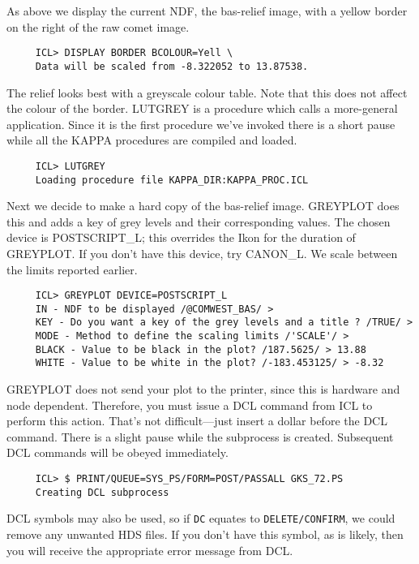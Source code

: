 As above we display the current NDF, the bas-relief image, with a yellow
border on the right of the raw comet image.

\small
\begin{verbatim}
     ICL> DISPLAY BORDER BCOLOUR=Yell \
     Data will be scaled from -8.322052 to 13.87538.
\end{verbatim}
\normalsize

The relief looks best with a greyscale colour table.  Note that this
does not affect the colour of the border.  LUTGREY is a procedure
which calls a more-general application.  Since it is the first
procedure we've invoked there is a short pause while all the {\small
KAPPA} procedures are compiled and loaded.

\small
\begin{verbatim}
     ICL> LUTGREY
     Loading procedure file KAPPA_DIR:KAPPA_PROC.ICL
\end{verbatim}
\normalsize

Next we decide to make a hard copy of the bas-relief image.  GREYPLOT
does this and adds a key of grey levels and their corresponding values.
The chosen device is POSTSCRIPT\_L; this overrides the Ikon for the
duration of GREYPLOT.  If you don't have this device, try CANON\_L.
We scale between the limits reported earlier.

\small
\begin{verbatim}
     ICL> GREYPLOT DEVICE=POSTSCRIPT_L
     IN - NDF to be displayed /@COMWEST_BAS/ >
     KEY - Do you want a key of the grey levels and a title ? /TRUE/ >
     MODE - Method to define the scaling limits /'SCALE'/ >
     BLACK - Value to be black in the plot? /187.5625/ > 13.88
     WHITE - Value to be white in the plot? /-183.453125/ > -8.32
\end{verbatim}
\normalsize

GREYPLOT does not send your plot to the printer, since this is hardware
and node dependent.  Therefore, you must issue a {\small DCL} command
from {\small ICL} to perform this action.  That's not difficult---just
insert a dollar before the {\small DCL} command.  There is a slight
pause while the subprocess is created.  Subsequent {\small DCL} commands
will be obeyed immediately. 

\small
\begin{verbatim}
     ICL> $ PRINT/QUEUE=SYS_PS/FORM=POST/PASSALL GKS_72.PS
     Creating DCL subprocess
\end{verbatim}
\normalsize

{\small DCL} symbols may also be used, so if {\tt DC} equates to
{\tt DELETE/CONFIRM}, we could remove any unwanted HDS files.  If you
don't have this symbol, as is likely, then you will receive the
appropriate error message from {\small DCL}.

